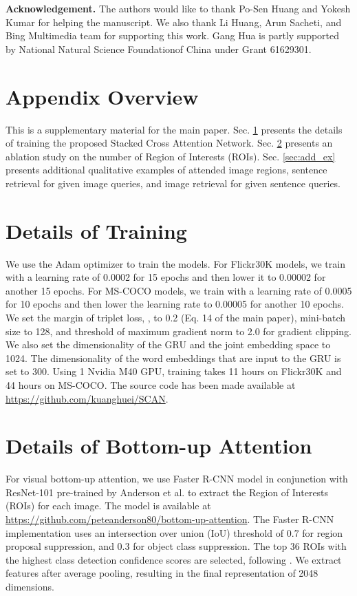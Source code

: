 \documentclass[runningheads]{llncs}
\begin{document}
\noindent
\textbf{Acknowledgement.} The authors would like to thank Po-Sen Huang and Yokesh Kumar for helping the manuscript. We also thank Li Huang, Arun Sacheti, and Bing Multimedia team for supporting this work. Gang Hua is partly supported by National Natural Science Foundationof China under Grant 61629301.

\appendix
\section*{Appendix Overview}
This is a supplementary material for the main paper. Sec. \ref{sec:training_detail} presents the details of training the proposed Stacked Cross Attention Network. Sec. \ref{sec:roi_ablation} presents an ablation study on the number of Region of Interests (ROIs). Sec. \ref{sec:add_ex} presents additional qualitative examples of attended image regions, sentence retrieval for given image queries, and image retrieval for given sentence queries.

\section{Details of Training}
\label{sec:training_detail}
We use the Adam optimizer \cite{kingma2014adam} to train the models. For Flickr30K models, we train with a learning rate of 0.0002 for 15 epochs and then lower it to 0.00002 for another 15 epochs. For MS-COCO \cite{lin2014microsoft} models, we train with a learning rate of 0.0005 for 10 epochs and then lower the learning rate to 0.00005 for another 10 epochs. We set the margin of triplet loss, , to 0.2 (Eq. 14 of the main paper), mini-batch size to 128, and threshold of maximum gradient norm to 2.0 for gradient clipping. We also set the dimensionality of the GRU and the joint embedding space to
1024. The dimensionality of the word embeddings that are input to the GRU is set to 300. Using 1 Nvidia M40 GPU, training takes 11 hours on Flickr30K and 44 hours on MS-COCO. The source code has been made available at \url{https://github.com/kuanghuei/SCAN}.


\section{Details of Bottom-up Attention}
\label{sec:roi_ablation}
For visual bottom-up attention, we use Faster R-CNN model in conjunction with ResNet-101 pre-trained by Anderson et al. \cite{anderson2017bottom} to extract the Region of Interests (ROIs) for each image. The model is available at \url{https://github.com/peteanderson80/bottom-up-attention}. The Faster R-CNN implementation uses an intersection over union (IoU) threshold of 0.7 for region proposal suppression, and 0.3 for object class suppression. The top 36 ROIs with the highest class detection confidence scores are selected, following \cite{anderson2017bottom}. We extract features after average pooling, resulting in the final representation of 2048 dimensions.
\end{document}
